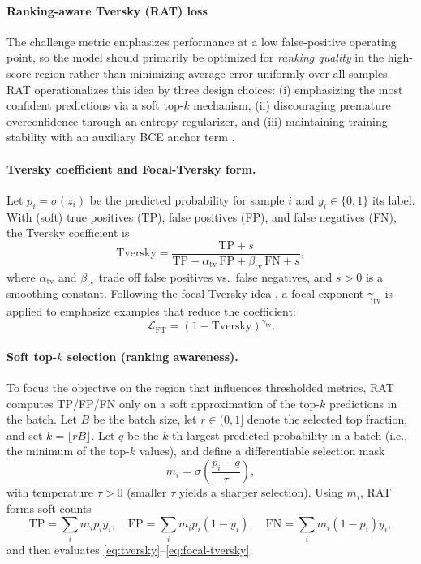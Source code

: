 \paragraph*{Ranking-aware Tversky (RAT) loss}
The challenge metric emphasizes performance at a low false-positive operating point, so the model should primarily be optimized for \emph{ranking quality} in the high-score region rather than minimizing average error uniformly over all samples.
RAT operationalizes this idea by three design choices: (i) emphasizing the most confident predictions via a soft top-$k$ mechanism, (ii) discouraging premature overconfidence through an entropy regularizer, and (iii) maintaining training stability with an auxiliary BCE anchor term \parencite{rat2025}.

\paragraph{Tversky coefficient and Focal-Tversky form.}
Let $p_i=\sigma(z_i)$ be the predicted probability for sample $i$ and $y_i\in\{0,1\}$ its label.
With (soft) true positives (TP), false positives (FP), and false negatives (FN), the Tversky coefficient is
\begin{equation}
  \mathrm{Tversky} = \frac{\mathrm{TP}+s}{\mathrm{TP} + \alpha_{\mathrm{tv}}\,\mathrm{FP} + \beta_{\mathrm{tv}}\,\mathrm{FN} + s},
  \label{eq:tversky}
\end{equation}
where $\alpha_{\mathrm{tv}}$ and $\beta_{\mathrm{tv}}$ trade off false positives vs.\ false negatives, and $s>0$ is a smoothing constant.
Following the focal-Tversky idea \parencite{focal_tversky_2018}, a focal exponent $\gamma_{\mathrm{tv}}$ is applied to emphasize examples that reduce the coefficient:
\begin{equation}
  \mathcal{L}_{\text{FT}} = \left(1 - \mathrm{Tversky}\right)^{\gamma_{\mathrm{tv}}}.
  \label{eq:focal-tversky}
\end{equation}

\paragraph{Soft top-$k$ selection (ranking awareness).}
To focus the objective on the region that influences thresholded metrics, RAT computes TP/FP/FN only on a soft approximation of the top-$k$ predictions in the batch.
Let $B$ be the batch size, let $r\in(0,1]$ denote the selected top fraction, and set $k=\lfloor rB \rfloor$.
Let $q$ be the $k$-th largest predicted probability in a batch (i.e., the minimum of the top-$k$ values), and define a differentiable selection mask
\begin{equation}
  m_i = \sigma\!\left(\frac{p_i - q}{\tau}\right),
  \label{eq:rat-mask}
\end{equation}
with temperature $\tau>0$ (smaller $\tau$ yields a sharper selection).
Using $m_i$, RAT forms soft counts
\begin{equation}
  \mathrm{TP}=\sum_i m_i p_i y_i,\quad
  \mathrm{FP}=\sum_i m_i p_i (1-y_i),\quad
  \mathrm{FN}=\sum_i m_i (1-p_i) y_i,
  \label{eq:rat-counts}
\end{equation}
and then evaluates \eqref{eq:tversky}--\eqref{eq:focal-tversky}.

